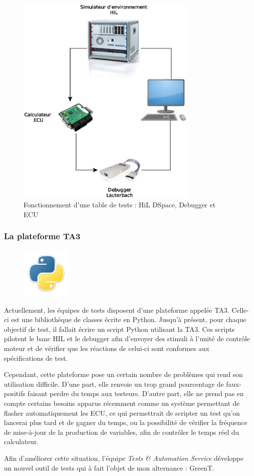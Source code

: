 \begin{figure}[H]
	\centering
	\includegraphics[width=8.8cm]{contents/images/WB.eps}
	\caption{Fonctionnement d'une table de tests : HiL DSpace, Debugger et ECU}
	\label{fig:wb}
\end{figure}

\subsubsection{La plateforme TA3}\label{ta3}
\begin{figure}
	\includegraphics[width=2.5cm]{contents/images/python.png}
\end{figure}
Actuellement, les équipes de tests disposent d'une plateforme appelée TA3. Celle-ci est une bibliothèque de classes écrite en Python. Jusqu'à présent, pour chaque objectif de test, il fallait écrire un script Python utilisant la TA3. Ces scripts pilotent le banc HIL et le debugger afin d'envoyer des stimuli à l'unité de contrôle moteur et de vérifier que les réactions de celui-ci sont conformes aux spécifications de test.

Cependant, cette plateforme pose un certain nombre de problèmes qui rend son utilisation difficile. D'une part, elle renvoie un trop grand pourcentage de faux-positifs faisant perdre du temps aux testeurs. D'autre part, elle ne prend pas en compte certains besoins apparus récemment comme un système permettant de flasher automatiquement les ECU, ce qui permettrait de scripter un test qu'on lancerai plus tard et de gagner du temps, ou la possibilité de vérifier la fréquence de mise-à-jour de la production de variables, afin de contrôler le temps réel du calculateur.

Afin d'améliorer cette situation, l'équipe \textit{Tests \& Automation Service} développe un nouvel outil de tests qui à fait l'objet de mon alternance : GreenT.

